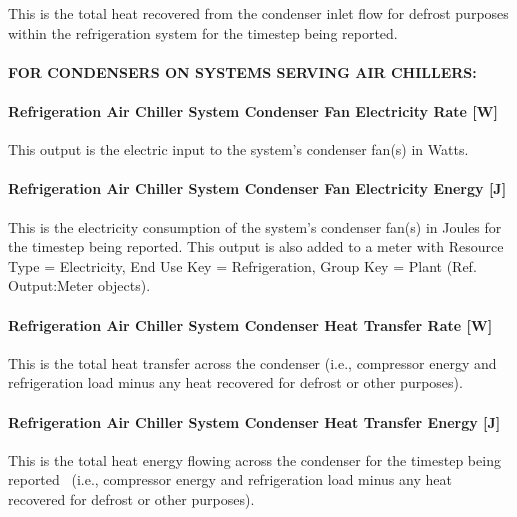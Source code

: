 This is the total heat recovered from the condenser inlet flow for defrost purposes within the refrigeration system for the timestep being reported.

\paragraph{FOR CONDENSERS ON SYSTEMS SERVING AIR CHILLERS:}\label{for-condensers-on-systems-serving-air-chillers}

\paragraph{Refrigeration Air Chiller System Condenser Fan Electricity Rate {[}W{]}}\label{refrigeration-air-chiller-system-condenser-fan-electric-power-w}

This output is the electric input to the system's condenser fan(s) in Watts.

\paragraph{Refrigeration Air Chiller System Condenser Fan Electricity Energy {[}J{]}}\label{refrigeration-air-chiller-system-condenser-fan-electric-energy-j}

This is the electricity consumption of the system's condenser fan(s) in Joules for the timestep being reported. This output is also added to a meter with Resource Type = Electricity, End Use Key = Refrigeration, Group Key = Plant (Ref. Output:Meter objects).

\paragraph{Refrigeration Air Chiller System Condenser Heat Transfer Rate {[}W{]}}\label{refrigeration-air-chiller-system-condenser-heat-transfer-rate-w}

This is the total heat transfer across the condenser (i.e., compressor energy and refrigeration load minus any heat recovered for defrost or other purposes).

\paragraph{Refrigeration Air Chiller System Condenser Heat Transfer Energy {[}J{]}}\label{refrigeration-air-chiller-system-condenser-heat-transfer-energy-j}

This is the total heat energy flowing across the condenser for the timestep being reported~ (i.e., compressor energy and refrigeration load minus any heat recovered for defrost or other purposes).

